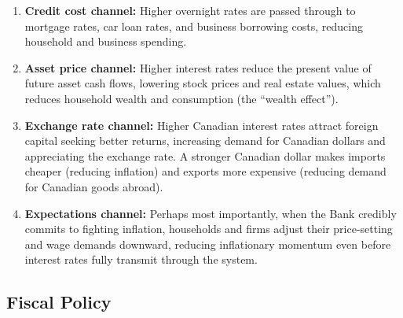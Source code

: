 \begin{enumerate}
  \item \textbf{Credit cost channel:} Higher overnight rates are passed
        through to mortgage rates, car loan rates, and business borrowing
        costs, reducing household and business spending.
  \item \textbf{Asset price channel:} Higher interest rates reduce the
        present value of future asset cash flows, lowering stock prices
        and real estate values, which reduces household wealth and
        consumption (the ``wealth effect'').
  \item \textbf{Exchange rate channel:} Higher Canadian interest rates
        attract foreign capital seeking better returns, increasing demand
        for Canadian dollars and appreciating the exchange rate. A stronger
        Canadian dollar makes imports cheaper (reducing inflation) and
        exports more expensive (reducing demand for Canadian goods abroad).
  \item \textbf{Expectations channel:} Perhaps most importantly, when
        the Bank credibly commits to fighting inflation, households and
        firms adjust their price-setting and wage demands downward,
        reducing inflationary momentum even before interest rates fully
        transmit through the system.
\end{enumerate}

\subsection{Fiscal Policy}

